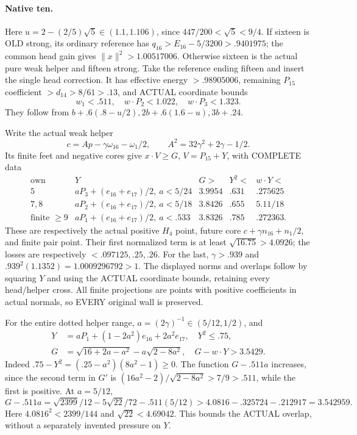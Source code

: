 \documentclass[11pt]{article}
\theoremstyle{definition}
\theoremstyle{remark}
\begin{document}
\paragraph{Native ten.}
Here \(u=2-(2/5)\sqrt5\in(1.1,1.106)\), since
\(447/200<\sqrt5<9/4\).
If sixteen is OLD strong, its ordinary reference has
\(q_{16}>E_{16}-5/3200>.9401975\); the common head gain gives
\(\|x\|^2>1.00517006\).
Otherwise sixteen is the actual pure weak helper and fifteen strong.
Take the reference ending fifteen and insert the single head correction.
It has effective energy \(>.98905006\), remaining \(P_{15}\) coefficient
\(>d_{14}>8/61>.13\), and ACTUAL coordinate bounds
\[
                   w_1<.511,\quad w\cdot P_2<1.022,\quad
                                             w\cdot P_3<1.323 .
\]
They follow from \(b+.6(.8-u/2),2b+.6(1.6-u),3b+.24\).

Write the actual weak helper
\[
 c=Ap-\gamma\omega_{16}-\omega_1/2,\qquad
                              A^2=32\gamma^2+2\gamma-1/2 .
\]
Its finite feet and negative cores give \(x\cdot V\ge G\),
\(V=P_{15}+Y\), with COMPLETE data
\[
\begin{array}{c|c|c|c|c}
 \text{own}&Y&G>&Y^2<&w\cdot Y<\\ \hline
 5&aP_3+(e_{16}+e_{17})/2,\ a<5/24&3.9954&.631&.275625\\
 7,8&aP_2+(e_{16}+e_{17})/2,\ a<5/18&3.8426&.655&5.11/18\\
 \text{finite }\ge9&aP_1+(e_{16}+e_{17})/2,\ a<.533
                                       &3.8326&.785&.272363 .
\end{array}
\]
These are respectively the actual positive \(H_4\) point, future core
\(c+\gamma n_{16}+n_1/2\), and finite pair point.
Their first normalized term is at least \(\sqrt{16.75}>4.0926\);
the losses are respectively \(<.097125,.25,.26\).
For the last, \(\gamma>.939\) and
\(.939^2(1.1352)=1.0009296792>1\).
The displayed norms and overlaps follow by squaring \(Y\) and using
the ACTUAL coordinate bounds, retaining every head/helper cross.
All finite projections are points with positive coefficients in actual
normals, so EVERY original wall is preserved.

For the entire dotted helper range,
\(a=(2\gamma)^{-1}\in(5/12,1/2)\), and
\[
\begin{split}
 Y&=aP_1+(1-2a^2)e_{16}+2a^2e_{17},\quad Y^2\le.75,\\
 G&=\sqrt{16+2a-a^2}-a\sqrt{2-8a^2},\quad
                                              G-w\cdot Y>3.5429 .
\end{split}
\]
Indeed \(.75-Y^2=(.25-a^2)(8a^2-1)\ge0\).
The function \(G-.511a\) increases, since the second term in \(G'\)
is \((16a^2-2)/\sqrt{2-8a^2}>7/9>.511\), while the first is positive.
At \(a=5/12\),
\[
 G-.511a=\sqrt{2399}/12-5\sqrt{22}/72-.511(5/12)
                    >4.0816-.325724-.212917=3.542959 .
\]
Here \(4.0816^2<2399/144\) and \(\sqrt{22}<4.69042\).
This bounds the ACTUAL overlap, without a separately invented pressure
on \(Y\).
\end{document}
